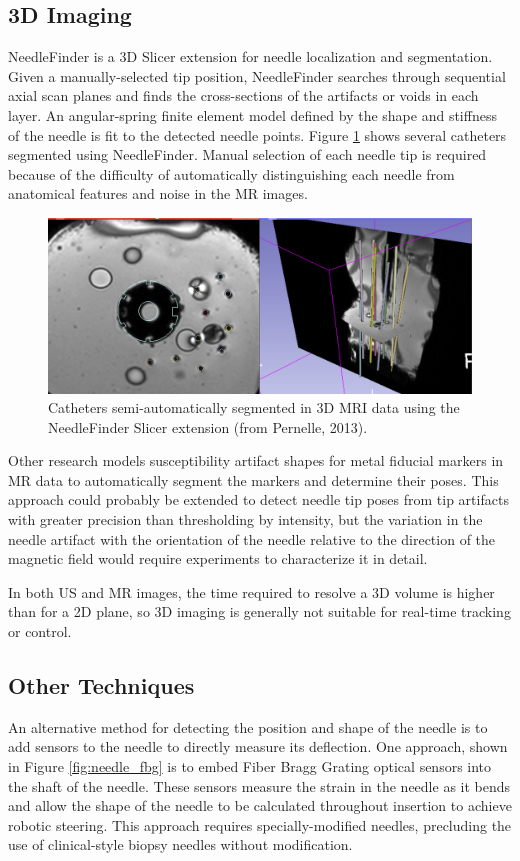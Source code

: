 \subsection{3D Imaging}
NeedleFinder is a 3D Slicer extension for needle localization and segmentation\cite{pernelle_validation_2013}. Given a manually-selected tip position, NeedleFinder searches through sequential axial scan planes and finds the cross-sections of the artifacts or voids in each layer. An angular-spring finite element model defined by the shape and stiffness of the needle is fit to the detected needle points. Figure \ref{fig:needlefinder} shows several catheters segmented using NeedleFinder. Manual selection of each needle tip is required because of the difficulty of automatically distinguishing each needle from anatomical features and noise in the MR images.

\begin{figure}[h]
\includegraphics[width=1.0\textwidth]{Fig/chap2/needlefinder.png}
\caption{Catheters semi-automatically segmented in 3D MRI data using the NeedleFinder Slicer extension (from Pernelle, 2013).}
\label{fig:needlefinder}
\end{figure}

Other research models susceptibility artifact shapes for metal fiducial markers in MR data to automatically segment the markers and determine their poses\cite{zijlstra_fast_2017}. This approach could probably be extended to detect needle tip poses from tip artifacts with greater precision than thresholding by intensity, but the variation in the needle artifact with the orientation of the needle relative to the direction of the magnetic field would require experiments to characterize it in detail.

In both US and MR images, the time required to resolve a 3D volume is higher than for a 2D plane, so 3D imaging is generally not suitable for real-time tracking or control.

\subsection{Other Techniques}
An alternative method for detecting the position and shape of the needle is to add sensors to the needle to directly measure its deflection. One approach, shown in Figure \ref{fig:needle_fbg} is to embed Fiber Bragg Grating optical sensors into the shaft of the needle\cite{roesthuis_three-dimensional_2014}. These sensors measure the strain in the needle as it bends and allow the shape of the needle to be calculated throughout insertion to achieve robotic steering. This approach requires specially-modified needles, precluding the use of clinical-style biopsy needles without modification.

